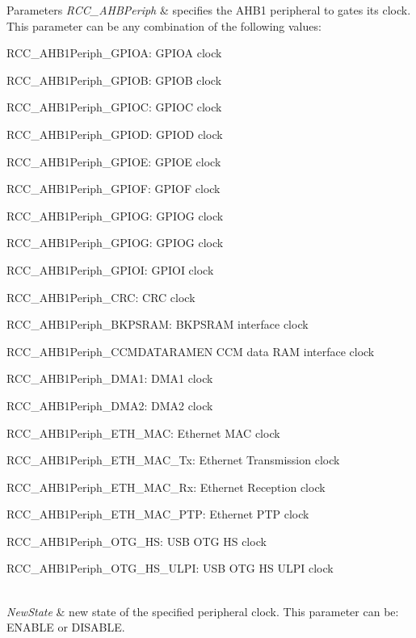 \begin{DoxyParams}{Parameters}
{\em R\+C\+C\+\_\+\+A\+H\+B\+Periph} & specifies the A\+H\+B1 peripheral to gates its clock. This parameter can be any combination of the following values\+: \begin{DoxyItemize}
\item R\+C\+C\+\_\+\+A\+H\+B1\+Periph\+\_\+\+G\+P\+I\+OA\+: G\+P\+I\+OA clock \item R\+C\+C\+\_\+\+A\+H\+B1\+Periph\+\_\+\+G\+P\+I\+OB\+: G\+P\+I\+OB clock \item R\+C\+C\+\_\+\+A\+H\+B1\+Periph\+\_\+\+G\+P\+I\+OC\+: G\+P\+I\+OC clock \item R\+C\+C\+\_\+\+A\+H\+B1\+Periph\+\_\+\+G\+P\+I\+OD\+: G\+P\+I\+OD clock \item R\+C\+C\+\_\+\+A\+H\+B1\+Periph\+\_\+\+G\+P\+I\+OE\+: G\+P\+I\+OE clock \item R\+C\+C\+\_\+\+A\+H\+B1\+Periph\+\_\+\+G\+P\+I\+OF\+: G\+P\+I\+OF clock \item R\+C\+C\+\_\+\+A\+H\+B1\+Periph\+\_\+\+G\+P\+I\+OG\+: G\+P\+I\+OG clock \item R\+C\+C\+\_\+\+A\+H\+B1\+Periph\+\_\+\+G\+P\+I\+OG\+: G\+P\+I\+OG clock \item R\+C\+C\+\_\+\+A\+H\+B1\+Periph\+\_\+\+G\+P\+I\+OI\+: G\+P\+I\+OI clock \item R\+C\+C\+\_\+\+A\+H\+B1\+Periph\+\_\+\+C\+RC\+: C\+RC clock \item R\+C\+C\+\_\+\+A\+H\+B1\+Periph\+\_\+\+B\+K\+P\+S\+R\+AM\+: B\+K\+P\+S\+R\+AM interface clock \item R\+C\+C\+\_\+\+A\+H\+B1\+Periph\+\_\+\+C\+C\+M\+D\+A\+T\+A\+R\+A\+M\+EN C\+CM data R\+AM interface clock \item R\+C\+C\+\_\+\+A\+H\+B1\+Periph\+\_\+\+D\+M\+A1\+: D\+M\+A1 clock \item R\+C\+C\+\_\+\+A\+H\+B1\+Periph\+\_\+\+D\+M\+A2\+: D\+M\+A2 clock \item R\+C\+C\+\_\+\+A\+H\+B1\+Periph\+\_\+\+E\+T\+H\+\_\+\+M\+AC\+: Ethernet M\+AC clock \item R\+C\+C\+\_\+\+A\+H\+B1\+Periph\+\_\+\+E\+T\+H\+\_\+\+M\+A\+C\+\_\+\+Tx\+: Ethernet Transmission clock \item R\+C\+C\+\_\+\+A\+H\+B1\+Periph\+\_\+\+E\+T\+H\+\_\+\+M\+A\+C\+\_\+\+Rx\+: Ethernet Reception clock \item R\+C\+C\+\_\+\+A\+H\+B1\+Periph\+\_\+\+E\+T\+H\+\_\+\+M\+A\+C\+\_\+\+P\+TP\+: Ethernet P\+TP clock \item R\+C\+C\+\_\+\+A\+H\+B1\+Periph\+\_\+\+O\+T\+G\+\_\+\+HS\+: U\+SB O\+TG HS clock \item R\+C\+C\+\_\+\+A\+H\+B1\+Periph\+\_\+\+O\+T\+G\+\_\+\+H\+S\+\_\+\+U\+L\+PI\+: U\+SB O\+TG HS U\+L\+PI clock \end{DoxyItemize}
\\
\hline
{\em New\+State} & new state of the specified peripheral clock. This parameter can be\+: E\+N\+A\+B\+LE or D\+I\+S\+A\+B\+LE. \\
\hline
\end{DoxyParams}

